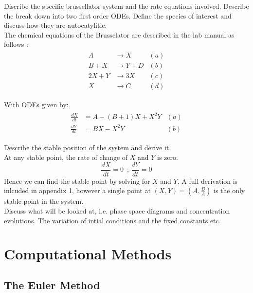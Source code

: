\documentclass[reprint, amsmath, amssymb, aps]{revtex4-2}
\begin{document}
Discribe the specific brussellator system and the rate equations involved. Describe the break down into two first order ODEs. Define the species of interest and discuss how they are autocatylitic.\\

The chemical equations of the Brusselator are described in the lab manual as follows \cite{manual}:
\begin{align}
	\begin{aligned}
	A &\rightarrow X & (a)\\
	B + X &\rightarrow Y + D & (b)\\
	2X + Y &\rightarrow 3X & (c)\\
	X &\rightarrow C & (d)
	\end{aligned}
\end{align}

With ODEs given by:
\begin{align}
	\begin{aligned}
	\frac{dX}{dt} &= A - (B + 1)X + X^2 Y & (a)\\
	\frac{dY}{dt} &= BX - X^2 Y & (b)
	\end{aligned}
\end{align}


Describe the stable position of the system and derive it.\\

At any stable point, the rate of change of $X$ and $Y$ is zero.
\begin{equation}
	\frac{dX}{dt}=0\,\text{  ;  }\frac{dY}{dt}=0
\end{equation}Hence we can find the stable point by solving for $X$ and $Y$. A full derivation is inlcuded in appendix 1, however a single point at $(X, Y) = \left(A, \frac{B}{A}\right)$ is the only stable point in the system.\\


Discuss what will be looked at, i.e. phase space diagrams and concentration evolutions. The variation of intial conditions and the fixed constants etc.\\

\section{Computational Methods}

\subsection{The Euler Method}
\end{document}

